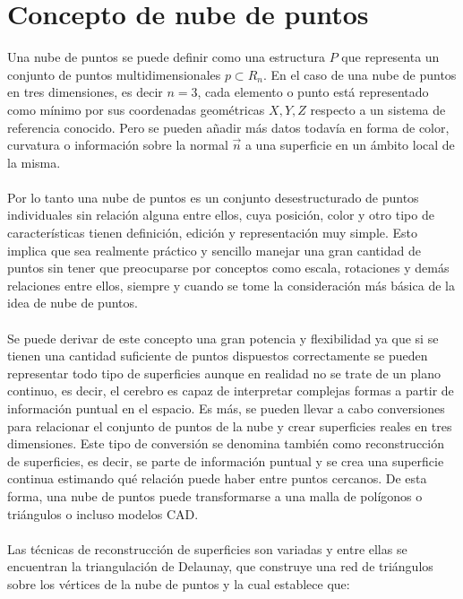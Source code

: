 \fi

\section{Concepto de nube de puntos}\label{section:nubes_ejemplo}
Una nube de puntos se puede definir como una estructura $P$ que representa un conjunto de puntos multidimensionales $p \subset R_{n}$. En el caso de una nube de puntos en tres dimensiones, es decir $n=3$, cada elemento o punto está representado como mínimo por sus coordenadas geométricas $X,Y, Z$ respecto a un sistema de referencia conocido. Pero se pueden añadir más datos todavía en forma de color, curvatura o información sobre la normal $\vec{n}$ a una superficie en un ámbito local de la misma.  
\\
\\
Por lo tanto una nube de puntos\cite{point_cloud} es un conjunto desestructurado de puntos individuales sin relación alguna entre ellos, cuya
posición, color\cite{point_cloud_rgb} y otro tipo de características tienen definición, edición y representación muy simple. Esto implica que sea realmente práctico y sencillo manejar una gran cantidad de puntos sin tener que preocuparse por
conceptos como escala, rotaciones y demás relaciones entre ellos, siempre y cuando se tome la consideración más básica de la idea de nube de puntos.
\\
\\
Se puede derivar de este concepto una gran potencia y flexibilidad ya que si se tienen una cantidad
suficiente de puntos dispuestos correctamente se pueden representar todo tipo de superficies aunque en
realidad no se trate de un plano continuo, es decir, el cerebro es capaz de interpretar complejas formas a
partir de información puntual en el espacio. Es más, se pueden llevar a cabo conversiones para relacionar el conjunto de puntos de la nube y crear
superficies reales en tres dimensiones. Este tipo de conversión se denomina también como reconstrucción de superficies, es decir, se parte de información puntual y se crea una superficie continua estimando qué
relación puede haber entre puntos cercanos. De esta forma, una nube de puntos puede transformarse a una
malla de polígonos o triángulos o incluso modelos CAD.
\\
\\
Las técnicas de reconstrucción de superficies son variadas y entre ellas se encuentran la triangulación de
Delaunay, que construye una red de triángulos sobre los vértices de la nube de puntos y la cual establece que:
